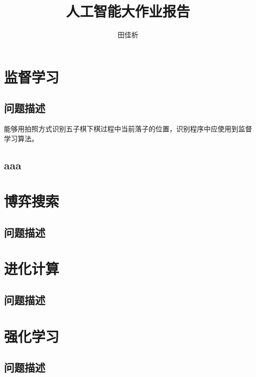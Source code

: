 \documentclass[UTF8]{ctexart}
\title{人工智能大作业报告}
\author{田佳析}
\begin{document}
\maketitle

\section{监督学习}
\subsection{问题描述}
能够用拍照方式识别五子棋下棋过程中当前落子的位置，识别程序中应使用到监督
学习算法。
\subsection{aaa}

\section{博弈搜索}
\subsection{问题描述}

\section{进化计算}
\subsection{问题描述}

\section{强化学习}
\subsection{问题描述}
\end{document}
